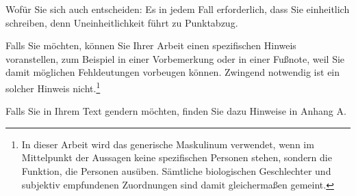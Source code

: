 Wofür Sie sich auch entscheiden: Es in jedem Fall erforderlich, dass Sie einheitlich schreiben, denn Uneinheitlichkeit führt zu Punktabzug.

Falls Sie möchten, können Sie Ihrer Arbeit einen spezifischen Hinweis voranstellen, zum Beispiel in einer Vorbemerkung oder in einer Fußnote, weil Sie damit möglichen Fehldeutungen vorbeugen können. Zwingend notwendig ist ein solcher Hinweis nicht.\footnote{In dieser Arbeit wird das generische Maskulinum verwendet, wenn im Mittelpunkt der Aussagen keine spezifischen Personen stehen, sondern die Funktion, die Personen ausüben. Sämtliche biologischen Geschlechter und subjektiv empfundenen Zuordnungen sind damit gleichermaßen gemeint.}

Falls Sie in Ihrem Text gendern möchten, finden Sie dazu Hinweise in Anhang A.